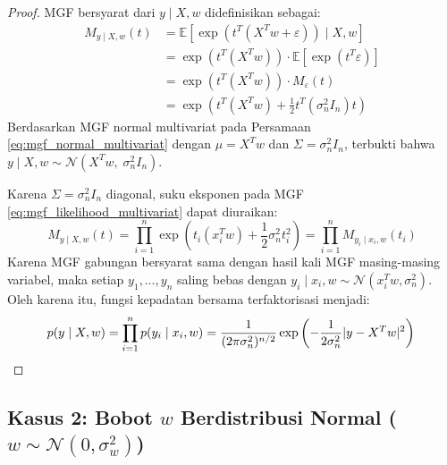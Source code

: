 \documentclass[11pt,a4paper]{article}
\def\boldsymbol#1{#1}%
\def\mathbf#1{#1}%
\theoremstyle{plain}
\theoremstyle{definition}
\theoremstyle{remark}
\begin{document}
\begin{proof}
MGF bersyarat dari $\mathbf{y} \mid X, \mathbf{w}$ didefinisikan sebagai:
\begin{align}
M_{\mathbf{y} \mid X, \mathbf{w}}(\mathbf{t}) &= \mathbb{E}\left[ \exp\left( \mathbf{t}^T (X^T \mathbf{w} + \boldsymbol{\varepsilon}) \right) \mid X, \mathbf{w} \right] \nonumber \\
&= \exp\left( \mathbf{t}^T (X^T \mathbf{w}) \right) \cdot \mathbb{E}\left[ \exp\left( \mathbf{t}^T \boldsymbol{\varepsilon} \right) \right] \nonumber \\
&= \exp\left( \mathbf{t}^T (X^T \mathbf{w}) \right) \cdot M_{\boldsymbol{\varepsilon}}(\mathbf{t}) \nonumber \\
&= \exp\left( \mathbf{t}^T (X^T \mathbf{w}) + \frac{1}{2}\mathbf{t}^T \left( \sigma_n^2 I_n \right) \mathbf{t} \right) \label{eq:mgf_likelihood_multivariat}
\end{align}
Berdasarkan MGF normal multivariat pada Persamaan \eqref{eq:mgf_normal_multivariat} dengan $\boldsymbol{\mu} = X^T \mathbf{w}$ dan $\Sigma = \sigma_n^2 I_n$, terbukti bahwa $\mathbf{y} \mid X, \mathbf{w} \sim \mathcal{N}\left( X^T \mathbf{w}, \; \sigma_n^2 I_n \right)$.

Karena $\Sigma = \sigma_n^2 I_n$ diagonal, suku eksponen pada MGF \eqref{eq:mgf_likelihood_multivariat} dapat diuraikan:
\begin{equation}
M_{\mathbf{y} \mid X, \mathbf{w}}(\mathbf{t}) = \prod_{i=1}^n \exp\left( t_i (\mathbf{x}_i^T \mathbf{w}) + \frac{1}{2}\sigma_n^2 t_i^2 \right) = \prod_{i=1}^n M_{y_i \mid \mathbf{x}_i, \mathbf{w}}(t_i)
\end{equation}
Karena MGF gabungan bersyarat sama dengan hasil kali MGF masing-masing variabel, maka setiap $y_1, \dots, y_n$ saling bebas dengan $y_i \mid \mathbf{x}_i, \mathbf{w} \sim \mathcal{N}(\mathbf{x}_i^T \mathbf{w}, \sigma_n^2)$. Oleh karena itu, fungsi kepadatan bersama terfaktorisasi menjadi:
\begin{equation}
p(\mathbf{y} \mid X, \mathbf{w}) = \prod_{i=1}^n p(y_i \mid \mathbf{x}_i, \mathbf{w}) = \frac{1}{(2\pi \sigma_n^2)^{n/2}} \exp\left( -\frac{1}{2\sigma_n^2} |\mathbf{y} - X^T \mathbf{w}|^2 \right) \qedhere
\end{equation}
\end{proof}

\subsection{Kasus 2: Bobot \texorpdfstring{$w$}{w} Berdistribusi Normal (\texorpdfstring{$w \sim \mathcal{N}(0, \sigma_w^2)$}{w Gaussian})}
\label{subsec:kasus_2}
\end{document}

